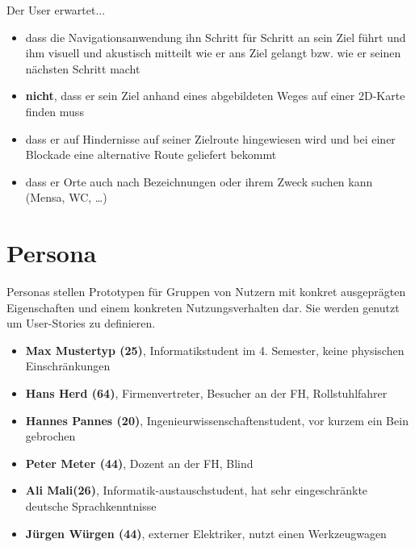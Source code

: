 \noindent Der User erwartet...
\begin{itemize}
  \item dass die Navigationsanwendung ihn Schritt für Schritt an sein Ziel führt
    und ihm visuell und akustisch mitteilt wie er ans Ziel gelangt bzw. wie er
    seinen nächsten Schritt macht
  \item \textbf{nicht}, dass er sein Ziel anhand eines abgebildeten Weges auf
    einer 2D-Karte finden muss
  \item dass er auf Hindernisse auf seiner Zielroute hingewiesen wird und bei
    einer Blockade eine alternative Route geliefert bekommt
  \item dass er Orte auch nach Bezeichnungen oder ihrem Zweck suchen kann
    (Mensa, WC, \dots)
\end{itemize}

\section{Persona}
Personas stellen Prototypen für Gruppen von Nutzern mit konkret ausgeprägten
Eigenschaften und einem konkreten Nutzungsverhalten dar. Sie werden genutzt um
User-Stories zu definieren.

\begin{itemize}
  \item \textbf{Max Mustertyp (25)}, Informatikstudent im 4. Semester, keine
    physischen Einschränkungen
  \item \textbf{Hans Herd (64)}, Firmenvertreter, Besucher an der FH,
    Rollstuhlfahrer
  \item \textbf{Hannes Pannes (20)}, Ingenieurwissenschaftenstudent, vor kurzem
    ein Bein gebrochen
  \item \textbf{Peter Meter (44)}, Dozent an der FH, Blind
  \item \textbf{Ali Mali(26)}, Informatik-austauschstudent, hat sehr
    eingeschränkte deutsche Sprachkenntnisse
  \item \textbf{Jürgen Würgen (44)}, externer Elektriker, nutzt einen
    Werkzeugwagen
\end{itemize}

